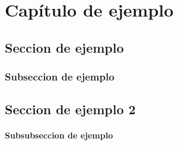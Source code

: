 \titleformat{\chapter}[display]
    {\normalfont\Large\bfseries}{\filleft\chaptertitlename\ \thechapter}{20pt}{\Huge}
    
\chapter{Capítulo de ejemplo}
    \lipsum[1-5]
\section{Seccion de ejemplo}
    \lipsum[1-4]
    \subsection{Subseccion de ejemplo}
        \lipsum[1-4]
\section{Seccion de ejemplo 2}
   \lipsum[1-3]
   \subsubsection{Subsubseccion de ejemplo}
   \lipsum[1-2]

